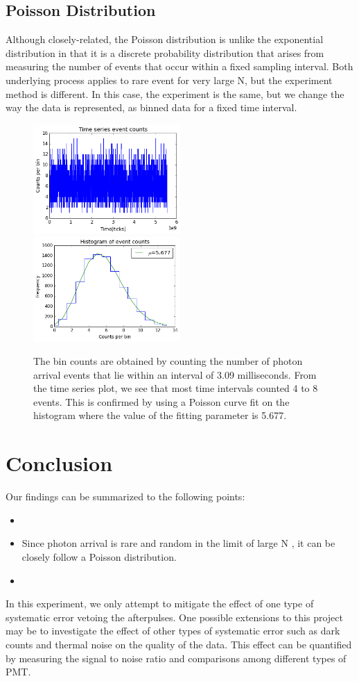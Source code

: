 \documentclass[authoryear, 12pt,5p, Times]{elsarticle}
\begin{document}
 	\subsection{Poisson Distribution}
 	Although closely-related, the Poisson distribution is unlike the exponential distribution in that it is a discrete probability distribution that arises from measuring the number of events that occur within a fixed sampling interval. Both underlying process applies to rare event for very large N, but the experiment method is different. In this case, the experiment is the same, but we change the way the data is represented, as binned data for a fixed time interval.
 	 	\begin{figure}[h]
			\includegraphics[width=0.5\textwidth]{figures/time_series}
			\includegraphics[width=0.5\textwidth]{figures/poisson_histo}
			\caption{The bin counts are obtained by counting the number of photon arrival events that lie within an interval of 3.09 milliseconds. From the time series plot, we see that most time intervals counted 4 to 8 events. This is confirmed by using a Poisson curve fit on the histogram where the value of the fitting parameter is 5.677.}
			\label{poisson}
		\end{figure}
\section{Conclusion\label{end}}
Our findings can be summarized to the following points: 
\begin{itemize}
\item 
\item Since photon arrival is rare and random in the limit of large N , it can be closely follow a Poisson distribution.
\item 
\end{itemize}
In this experiment, we only attempt to mitigate the effect of one type of systematic error vetoing the afterpulses. One possible extensions to this project may be to investigate the effect of other types of systematic error such as dark counts and thermal noise on the quality of the data. This effect can be quantified by measuring the signal to noise ratio and comparisons among different types of PMT.
\end{document}
